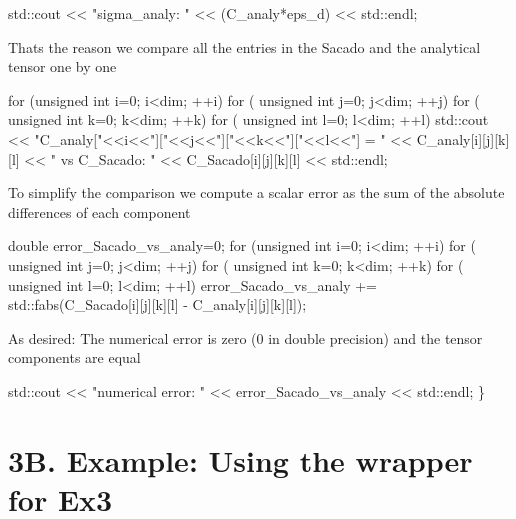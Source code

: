 \begin{DoxyCode}
std::cout << \textcolor{stringliteral}{"sigma\_analy: "} << (C\_analy*eps\_d) << std::endl;
\end{DoxyCode}
 That\textquotesingle{}s the reason we compare all the entries in the Sacado and the analytical tensor one by one 
\begin{DoxyCode}
\textcolor{keywordflow}{for} (\textcolor{keywordtype}{unsigned} \textcolor{keywordtype}{int} i=0; i<dim; ++i)
    \textcolor{keywordflow}{for} ( \textcolor{keywordtype}{unsigned} \textcolor{keywordtype}{int} j=0; j<dim; ++j)
        \textcolor{keywordflow}{for} ( \textcolor{keywordtype}{unsigned} \textcolor{keywordtype}{int} k=0; k<dim; ++k)
            \textcolor{keywordflow}{for} ( \textcolor{keywordtype}{unsigned} \textcolor{keywordtype}{int} l=0; l<dim; ++l)
                std::cout << \textcolor{stringliteral}{"C\_analy["}<<i<<\textcolor{stringliteral}{"]["}<<j<<\textcolor{stringliteral}{"]["}<<k<<\textcolor{stringliteral}{"]["}<<l<<\textcolor{stringliteral}{"] = "} << C\_analy[i][j][k][l] << \textcolor{stringliteral}{"
       vs C\_Sacado: "} << C\_Sacado[i][j][k][l] << std::endl;
\end{DoxyCode}
 To simplify the comparison we compute a scalar error as the sum of the absolute differences of each component 
\begin{DoxyCode}
\textcolor{keywordtype}{double} error\_Sacado\_vs\_analy=0;
\textcolor{keywordflow}{for} (\textcolor{keywordtype}{unsigned} \textcolor{keywordtype}{int} i=0; i<dim; ++i)
    \textcolor{keywordflow}{for} ( \textcolor{keywordtype}{unsigned} \textcolor{keywordtype}{int} j=0; j<dim; ++j)
        \textcolor{keywordflow}{for} ( \textcolor{keywordtype}{unsigned} \textcolor{keywordtype}{int} k=0; k<dim; ++k)
            \textcolor{keywordflow}{for} ( \textcolor{keywordtype}{unsigned} \textcolor{keywordtype}{int} l=0; l<dim; ++l)
                error\_Sacado\_vs\_analy += std::fabs(C\_Sacado[i][j][k][l] - C\_analy[i][j][k][l]);
\end{DoxyCode}
 As desired\+: The numerical error is zero (0 in double precision) and the tensor components are equal 
\begin{DoxyCode}
    std::cout << \textcolor{stringliteral}{"numerical error: "} << error\_Sacado\_vs\_analy << std::endl;
\}
\end{DoxyCode}
 \hypertarget{index_Ex3B}{}\section{3\+B. Example\+: Using the wrapper for Ex3}\label{index_Ex3B}

